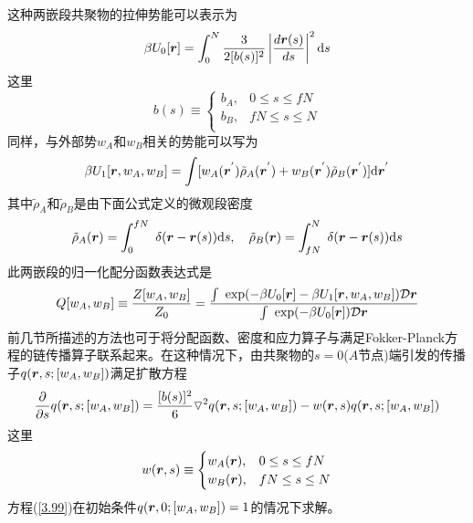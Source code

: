这种两嵌段共聚物的拉伸势能可以表示为
\begin{equation}
\beta U_0[\bm{r}]=\int_{0}^{N} \frac{3}{2[b(s)]^2}\left| \frac{d\bm{r}(s)}{ds} \right|^2 \mathrm{d}s
\end{equation}
这里
\begin{equation}
b(s)\equiv
\begin{cases}
b_A, & 0\leq s \leq fN \\
b_B, & fN \leq s \leq N\\
\end{cases}
\end{equation}
同样，与外部势$w_A$和$w_B$相关的势能可以写为
\begin{equation}
\beta U_1[\bm{r},w_A,w_B]=\int [w_A(\bm{r}^{'})\tilde{\rho}_{A}(\bm{r}^{'})+w_B(\bm{r}^{'})\tilde{\rho}_{B}(\bm{r}^{'})] \mathrm{d}\bm{r}^{'}
\end{equation}
其中$\tilde{\rho} _A$和$\tilde{\rho} _B$是由下面公式定义的微观段密度
\begin{equation}
\tilde{\rho} _A(\bm{r})=\int _0^{fN} ~\delta(\bm{r}-\bm{r}(s)) \mathrm{d}s,~~~\tilde{\rho} _B(\bm{r})=\int _{fN}^{N} ~\delta(\bm{r}-\bm{r}(s)) \mathrm{d}s
\end{equation}
此两嵌段的归一化配分函数表达式是
\begin{equation}
Q[w_A,w_B]\equiv\frac{Z[w_A,w_B]}{Z_0}=\frac{\int ~\exp(-\beta U_0[\bm{r}]-\beta U_1[\bm{r},w_A,w_B]) \mathcal{D}\bm{r}}{\int ~\exp(-\beta U_0[\bm{r}]) \mathcal{D}\bm{r}}
\end{equation}
前几节所描述的方法也可于将分配函数、密度和应力算子与满足Fokker-Planck方程的链传播算子联系起来。在这种情况下，由共聚物的$s=0$($A$节点)端引发的传播子$q(\bm{r},s;[w_A,w_B])$满足扩散方程
\begin{equation}
\frac{\partial}{\partial s}q(\bm{r},s;[w_A,w_B])=\frac{[b(s)]^2}{6}\triangledown ^2q(\bm{r},s;[w_A,w_B])-w(\bm{r},s)q(\bm{r},s;[w_A,w_B]) \label{3.99}
\end{equation}
这里
\begin{equation}
w(\bm{r},s)\equiv
\begin{cases}
w_A(\bm{r}), & 0\leq s \leq fN \\
w_B(\bm{r}), & fN \leq s \leq N\\
\end{cases}
\end{equation}
方程(\ref{3.99})在初始条件$q(\bm{r},0;[w_A,w_B])=1$的情况下求解。

